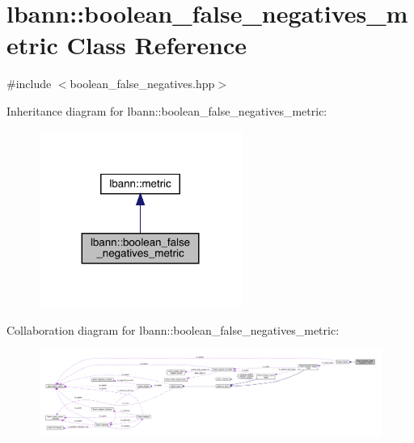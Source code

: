 \hypertarget{classlbann_1_1boolean__false__negatives__metric}{}\section{lbann\+:\+:boolean\+\_\+false\+\_\+negatives\+\_\+metric Class Reference}
\label{classlbann_1_1boolean__false__negatives__metric}


{\ttfamily \#include $<$boolean\+\_\+false\+\_\+negatives.\+hpp$>$}



Inheritance diagram for lbann\+:\+:boolean\+\_\+false\+\_\+negatives\+\_\+metric\+:\nopagebreak
\begin{figure}[H]
\begin{center}
\leavevmode
\includegraphics[width=188pt]{classlbann_1_1boolean__false__negatives__metric__inherit__graph}
\end{center}
\end{figure}


Collaboration diagram for lbann\+:\+:boolean\+\_\+false\+\_\+negatives\+\_\+metric\+:\nopagebreak
\begin{figure}[H]
\begin{center}
\leavevmode
\includegraphics[width=350pt]{classlbann_1_1boolean__false__negatives__metric__coll__graph}
\end{center}
\end{figure}
